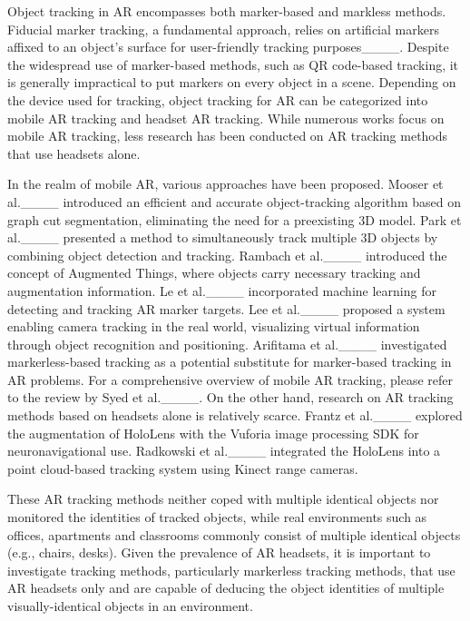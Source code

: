 Object tracking in AR encompasses both marker-based and markless methods. Fiducial marker tracking, a fundamental approach, relies on artificial markers affixed to an object's surface for user-friendly tracking purposes____. Despite the widespread use of marker-based methods, such as QR code-based tracking, it is generally impractical to put markers on every object in a scene. Depending on the device used for tracking, object tracking for AR can be categorized into mobile AR tracking and headset AR tracking. While numerous works focus on mobile AR tracking, less research has been conducted on AR tracking methods that use headsets alone.

In the realm of mobile AR, various approaches have been proposed. Mooser et al.____ introduced an efficient and accurate object-tracking algorithm based on graph cut segmentation, eliminating the need for a preexisting 3D model. Park et al.____ presented a method to simultaneously track multiple 3D objects by combining object detection and tracking. Rambach et al.____ introduced the concept of Augmented Things, where objects carry necessary tracking and augmentation information. Le et al.____ incorporated machine learning for detecting and tracking AR marker targets. Lee et al.____ proposed a system enabling camera tracking in the real world, visualizing virtual information through object recognition and positioning. Arifitama et al.____ investigated markerless-based tracking as a potential substitute for marker-based tracking in AR problems. For a comprehensive overview of mobile AR tracking, please refer to the review by Syed et al.____. On the other hand, research on AR tracking methods based on headsets alone is relatively scarce. Frantz et al.____ explored the augmentation of HoloLens with the Vuforia image processing SDK for neuronavigational use. Radkowski et al.____ integrated the HoloLens into a point cloud-based tracking system using Kinect range cameras.

These AR tracking methods neither coped with multiple identical objects nor monitored the identities of tracked objects, while real environments such as offices, apartments and classrooms commonly consist of multiple identical objects (e.g., chairs, desks). Given the prevalence of AR headsets, it is important to investigate tracking methods, particularly markerless tracking methods, that use AR headsets only and are capable of deducing the object identities of multiple visually-identical objects in an environment.